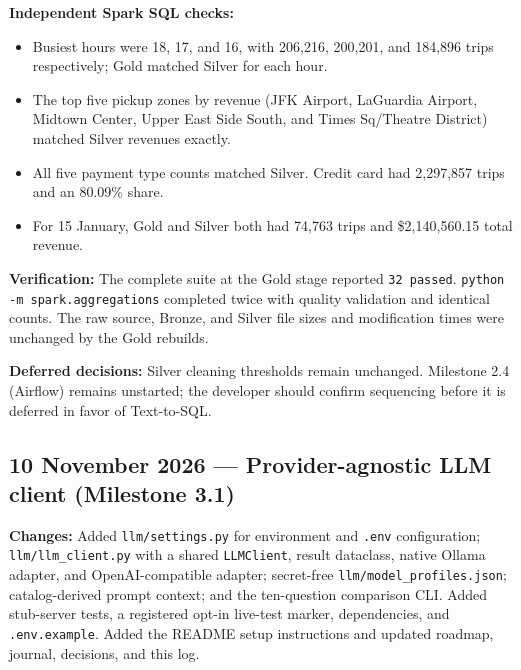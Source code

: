 \documentclass[11pt,a4paper]{article}
\begin{document}
\textbf{Independent Spark SQL checks:}
\begin{itemize}
  \item Busiest hours were 18, 17, and 16, with 206,216, 200,201, and 184,896
        trips respectively; Gold matched Silver for each hour.
  \item The top five pickup zones by revenue (JFK Airport, LaGuardia Airport,
        Midtown Center, Upper East Side South, and Times Sq/Theatre District)
        matched Silver revenues exactly.
  \item All five payment type counts matched Silver. Credit card had
        2,297,857 trips and an 80.09\% share.
  \item For 15 January, Gold and Silver both had 74,763 trips and
        \$2,140,560.15 total revenue.
\end{itemize}

\textbf{Verification:} The complete suite at the Gold stage reported
\texttt{32 passed}. \texttt{python -m spark.aggregations} completed twice with
quality validation and identical counts. The raw source, Bronze, and Silver
file sizes and modification times were unchanged by the Gold rebuilds.

\textbf{Deferred decisions:} Silver cleaning thresholds remain unchanged.
Milestone 2.4 (Airflow) remains unstarted; the developer should confirm
sequencing before it is deferred in favor of Text-to-SQL.

\subsection{10 November 2026 --- Provider-agnostic LLM client (Milestone 3.1)}
\textbf{Changes:} Added \texttt{llm/settings.py} for environment and
\texttt{.env} configuration; \texttt{llm/llm\_client.py} with a shared
\texttt{LLMClient}, result dataclass, native Ollama adapter, and
OpenAI-compatible adapter; secret-free \texttt{llm/model\_profiles.json};
catalog-derived prompt context; and the ten-question comparison CLI. Added
stub-server tests, a registered opt-in live-test marker, dependencies, and
\texttt{.env.example}. Added the README setup instructions and updated roadmap,
journal, decisions, and this log.
\end{document}

